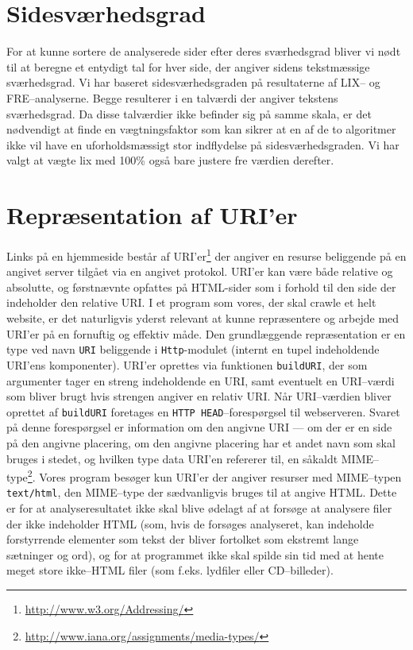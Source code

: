 \documentclass[a4paper,oneside]{memoir}
\begin{document}
\section{Sidesværhedsgrad}
For at kunne sortere de analyserede sider efter deres sværhedsgrad
bliver vi nødt til at beregne et entydigt tal for hver side, der
angiver sidens tekstmæssige sværhedsgrad. Vi har baseret
sidesværhedsgraden på resultaterne af LIX-- og FRE--analyserne. Begge
resulterer i en talværdi der angiver tekstens sværhedsgrad. Da disse
talværdier ikke befinder sig på samme skala, er det nødvendigt at
finde en vægtningsfaktor som kan sikrer at en af de to algoritmer ikke
vil have en uforholdsmæssigt stor indflydelse på
sidesværhedsgraden. Vi har valgt at vægte lix med 100\% også bare
justere fre værdien derefter.


\section{Repræsentation af URI'er}
\label{uriimpl}
Links på en hjemmeside består af
URI'er\footnote{\url{http://www.w3.org/Addressing/}} der angiver en
resurse beliggende på en angivet server tilgået via en angivet
protokol. URI'er kan være både relative og absolutte, og førstnævnte
opfattes på HTML-sider som i forhold til den side der indeholder den
relative URI. I et program som vores, der skal crawle et helt website,
er det naturligvis yderst relevant at kunne repræsentere og arbejde
med URI'er på en fornuftig og effektiv måde. Den grundlæggende
repræsentation er en type ved navn \texttt{URI} beliggende i
\texttt{Http}-modulet (internt en tupel indeholdende URI'ens
komponenter). URI'er oprettes via funktionen \texttt{buildURI}, der som
argumenter tager en streng indeholdende en URI, samt eventuelt en
URI--værdi som bliver brugt hvis strengen angiver en relativ URI. Når
URI--værdien bliver oprettet af \texttt{buildURI} foretages en
\texttt{HTTP HEAD}--forespørgsel til webserveren. Svaret på denne
forespørgsel er information om den angivne URI --- om der er en side
på den angivne placering, om den angivne placering har et andet navn
som skal bruges i stedet, og hvilken type data URI'en refererer til,
en såkaldt
MIME--type\footnote{\url{http://www.iana.org/assignments/media-types/}}. Vores
program besøger kun URI'er der angiver resurser med MIME--typen
\texttt{text/html}, den MIME--type der sædvanligvis bruges til at
angive HTML. Dette er for at analyseresultatet ikke skal blive ødelagt
af at forsøge at analysere filer der ikke indeholder HTML (som, hvis
de forsøges analyseret, kan indeholde forstyrrende elementer som tekst
der bliver fortolket som ekstremt lange sætninger og ord), og for at
programmet ikke skal spilde sin tid med at hente meget store
ikke--HTML filer (som f.eks. lydfiler eller CD--billeder).
\end{document}
